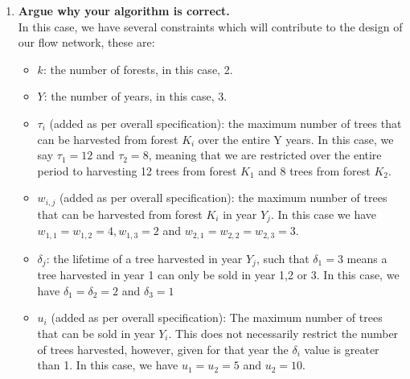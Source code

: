 \documentclass[11pt, oneside]{article}   	%
\begin{document}
\begin{enumerate}
\begin{enumerate}
\\
			\newpage
		\item \textbf{Argue why your algorithm is correct.}\\
		In this case, we have several constraints which will contribute to the design of our flow network, these are:
		\begin{itemize}
		\item $k$: the number of forests, in this case, 2.
		\item $Y$: the number of years, in this case, 3.
		\item $\tau_i$ (added as per overall specification): the maximum number of trees that can be harvested from forest $K_i$ over the entire Y years. In this case, we say $\tau_1=12$ and $\tau_2=8$, meaning that we are restricted over the entire period to harvesting 12 trees from forest $K_1$ and 8 trees from forest $K_2$.
		\item $w_{i,j}$ (added as per overall specification): the maximum number of trees that can be harvested from forest $K_i$ in year $Y_j$. In this case we have $w_{1,1}=w_{1,2}=4, w_{1,3}=2$ and $w_{2,1}=w_{2,2}=w_{2,3}=3$.
		\item $\delta_j$: the lifetime of a tree harvested in year $Y_j$, such that $\delta_1=3$ means a tree harvested in year 1 can only be sold in year 1,2 or 3. In this case, we have $\delta_1 =\delta_2 =2$ and $\delta_3 =1$
		\item $u_i$ (added as per overall specification): The maximum number of trees that can be sold in year $Y_i$. This does not necessarily restrict the number of trees harvested, however, given for that year the $\delta_i$ value is greater than 1. In this case, we have $u_1=u_2=5$ and $u_2=10$.
		\end{itemize}
		

\end{enumerate}
\end{enumerate}
\end{document}
